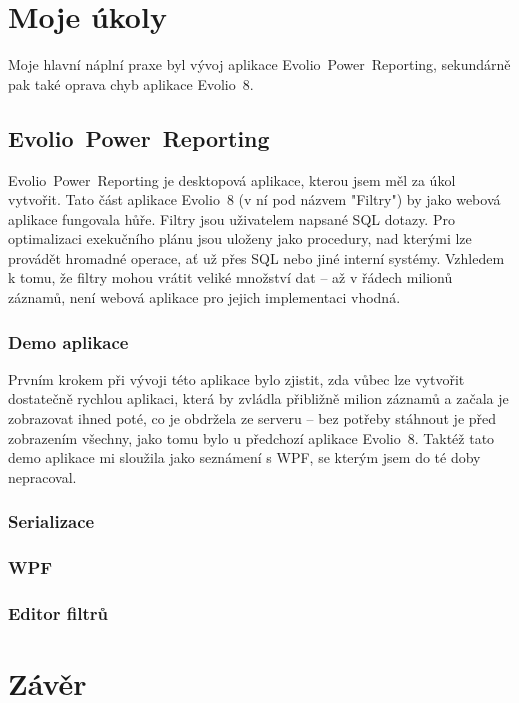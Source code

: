 \documentclass[czech,bachelor,dept460,male,csharp]{diploma}
\newcommand{\EvolioEight}{Evolio~8}
\newcommand{\EFilters}{Evolio~Power~Reporting}
\begin{document}
\section{Moje úkoly}
	Moje hlavní náplní praxe byl vývoj aplikace {\EFilters}, sekundárně pak také oprava chyb aplikace {\EvolioEight}.
	\subsection{\EFilters}
		{\EFilters} je desktopová aplikace, kterou jsem měl za úkol vytvořit. Tato část aplikace {\EvolioEight} (v ní pod názvem "Filtry") by jako webová aplikace fungovala hůře.
		Filtry jsou uživatelem napsané SQL dotazy. Pro optimalizaci exekučního plánu jsou uloženy jako procedury, nad kterými lze provádět hromadné operace, ať už přes SQL nebo jiné interní systémy.
		Vzhledem k tomu, že filtry mohou vrátit veliké množství dat – až v řádech milionů záznamů, není webová aplikace pro jejich implementaci vhodná.
		\subsubsection{Demo aplikace}
			Prvním krokem při vývoji této aplikace bylo zjistit, zda vůbec lze vytvořit dostatečně rychlou aplikaci, která by zvládla přibližně milion záznamů a začala je zobrazovat ihned poté, co je obdržela ze serveru – bez potřeby stáhnout je před zobrazením všechny, jako tomu bylo u předchozí aplikace {\EvolioEight}.
			Taktéž tato demo aplikace mi sloužila jako seznámení s WPF, se kterým jsem do té doby nepracoval.
		\subsubsection{Serializace}

		\subsubsection{WPF}

		\subsubsection{Editor filtrů}
\section{Závěr}


\printbibliography[title={Literatura}, heading=bibintoc]


\end{document}
